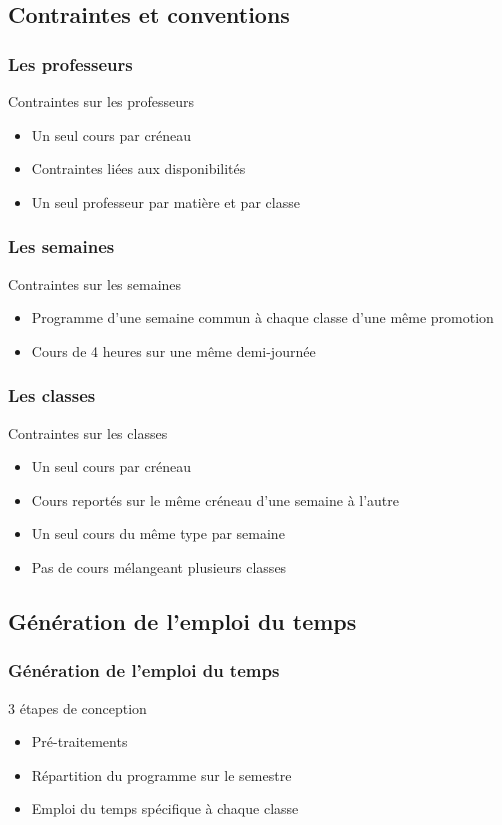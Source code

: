 \documentclass{beamer}
\begin{document}
\subsection{Contraintes et conventions}
\begin{frame}
\frametitle{Les professeurs}
\begin{block}{Contraintes sur les professeurs}
\begin{itemize}
\item Un seul cours par créneau
\item Contraintes liées aux disponibilités
\item Un seul professeur par matière et par classe
\end{itemize}
\end{block}
\end{frame}

\begin{frame}
\frametitle{Les semaines}
\begin{block}{Contraintes sur les semaines}
\begin{itemize}
\item Programme d'une semaine commun à chaque classe d'une même promotion
\item Cours de 4 heures sur une même demi-journée
\end{itemize}
\end{block}
\end{frame}

\begin{frame}
\frametitle{Les classes}
\begin{block}{Contraintes sur les classes}
\begin{itemize}
\item Un seul cours par créneau
\item Cours reportés sur le même créneau d'une semaine à l'autre
\item Un seul cours du même type par semaine
\item Pas de cours mélangeant plusieurs classes
\end{itemize}
\end{block}
\end{frame}

\subsection{Génération de l'emploi du temps}
\begin {frame}
\frametitle{Génération de l'emploi du temps}
\begin{block}{3 étapes de conception}
\begin{itemize}
\item Pré-traitements
\item Répartition du programme sur le semestre
\item Emploi du temps spécifique à chaque classe
\end{itemize}
\end{block}
\end{frame}
\end{document}

